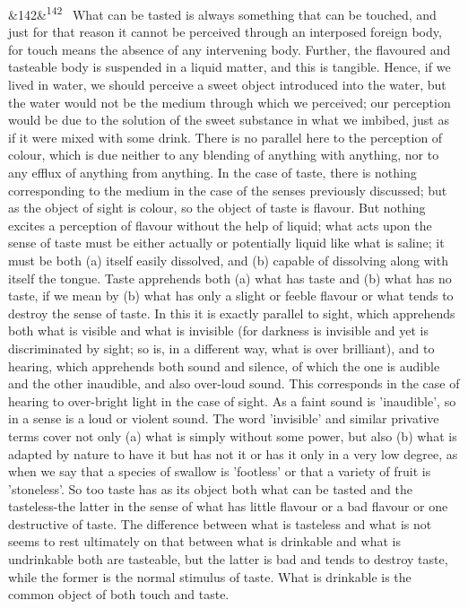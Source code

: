 \documentclass[12pt]{article}
\newcommand{\para}[1][]{\par\noindent\ifx&#1&\else\textsuperscript{\footnotesize #1}~\fi}
\begin{document}
\para[142] What can be tasted is always something that can be touched, and just for that reason it cannot be perceived through an interposed foreign body, for touch means the absence of any intervening body. Further, the flavoured and tasteable body is suspended in a liquid matter, and this is tangible. Hence, if we lived in water, we should perceive a sweet object introduced into the water, but the water would not be the medium through which we perceived; our perception would be due to the solution of the sweet substance in what we imbibed, just as if it were mixed with some drink. There is no parallel here to the perception of colour, which is due neither to any blending of anything with anything, nor to any efflux of anything from anything. In the case of taste, there is nothing corresponding to the medium in the case of the senses previously discussed; but as the object of sight is colour, so the object of taste is flavour. But nothing excites a perception of flavour without the help of liquid; what acts upon the sense of taste must be either actually or potentially liquid like what is saline; it must be both (a) itself easily dissolved, and (b) capable of dissolving along with itself the tongue. Taste apprehends both (a) what has taste and (b) what has no taste, if we mean by (b) what has only a slight or feeble flavour or what tends to destroy the sense of taste. In this it is exactly parallel to sight, which apprehends both what is visible and what is invisible (for darkness is invisible and yet is discriminated by sight; so is, in a different way, what is over brilliant), and to hearing, which apprehends both sound and silence, of which the one is audible and the other inaudible, and also over-loud sound. This corresponds in the case of hearing to over-bright light in the case of sight. As a faint sound is 'inaudible', so in a sense is a loud or violent sound. The word 'invisible' and similar privative terms cover not only (a) what is simply without some power, but also (b) what is adapted by nature to have it but has not it or has it only in a very low degree, as when we say that a species of swallow is 'footless' or that a variety of fruit is 'stoneless'. So too taste has as its object both what can be tasted and the tasteless-the latter in the sense of what has little flavour or a bad flavour or one destructive of taste. The difference between what is tasteless and what is not seems to rest ultimately on that between what is drinkable and what is undrinkable both are tasteable, but the latter is bad and tends to destroy taste, while the former is the normal stimulus of taste. What is drinkable is the common object of both touch and taste.
\end{document}
